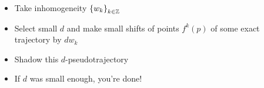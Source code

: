 \begin{itemize}
\item Take inhomogeneity $\left\{ {w}_{k} \right\}_{k\in\mathbb Z}$ \pause
\item Select small $d$ and make small shifts of points $f^k(p)$ of some exact trajectory by $dw_k$ \pause
\item Shadow this $d$-pseudotrajectory \pause
\item If $d$ was small enough, you're done!
\end{itemize} 